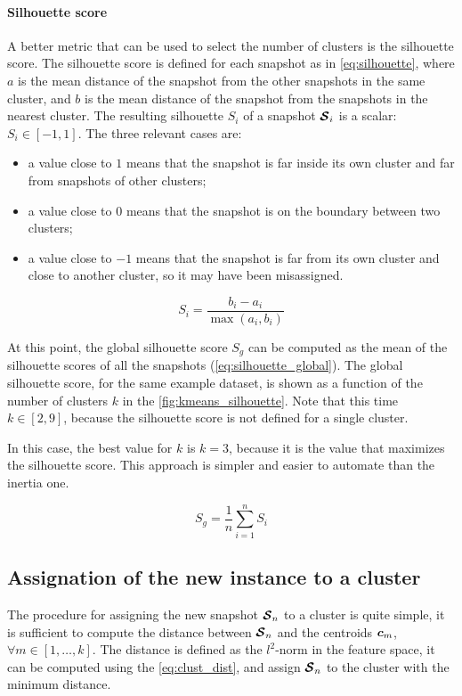 \paragraph*{Silhouette score}
A better metric that can be used to select the number of clusters is the silhouette score.
The silhouette score is defined for each snapshot as in \autoref{eq:silhouette}, where $a$ is the mean distance of the snapshot from the other snapshots in the same cluster, and $b$ is the mean distance of the snapshot from the snapshots in the nearest cluster. The resulting silhouette $S_i$ of a snapshot $\bm{\mathcal{S}}_i$ is a scalar: $S_i \in [-1,1]$.
The three relevant cases are:
\begin{itemize}
  \item a value close to $1$ means that the snapshot is far inside its own cluster and far from snapshots of other clusters;
  \item a value close to $0$ means that the snapshot is on the boundary between two clusters;
  \item a value close to $-1$ means that the snapshot is far from its own cluster and close to another cluster, so it may have been misassigned.
\end{itemize}

\begin{equation}
  \label{eq:silhouette}
  S_i = \frac{b_i - a_i}{\max{(a_i,b_i)}}
\end{equation}

At this point, the global silhouette score $S_g$ can be computed as the mean of the silhouette scores of all the snapshots (\autoref{eq:silhouette_global}). The global silhouette score, for the same example dataset, is shown as a function of the number of clusters $k$ in the \autoref{fig:kmeans_silhouette}. Note that this time $k \in [2,9]$, because the silhouette score is not defined for a single cluster.

In this case, the best value for $k$ is $k=3$, because it is the value that maximizes the silhouette score. This approach is simpler and easier to automate than the inertia one. 

\begin{equation}
  \label{eq:silhouette_global}
  S_g = \frac{1}{n}\sum_{i=1}^{n} S_i
\end{equation}

\subsection{Assignation of the new instance to a cluster}
The procedure for assigning the new snapshot $\bm{\mathcal{S}}_n$ to a cluster is quite simple, it is sufficient to compute the distance between $\bm{\mathcal{S}}_n$ and the centroids $\bm{c}_m$, $\forall m \in  [1, \dots , k]$. The distance is defined as the $l^2$-norm in the feature space, it can be computed using the \autoref{eq:clust_dist}, and assign $\bm{\mathcal{S}}_n$ to the cluster with the minimum distance.

